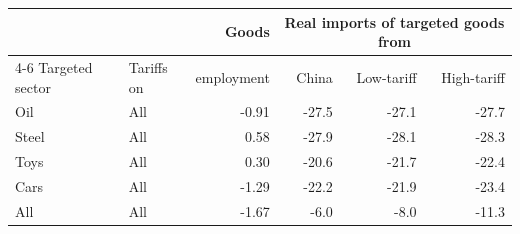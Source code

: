 \begin{tabular}{llrrrr}
\toprule
 & & Goods & \multicolumn{3}{c}{Real imports of targeted goods from} \\
\cmidrule(lr){4-6}
Targeted sector & Tariffs on & employment & China & Low-tariff & High-tariff \\
\midrule
Oil & All & -0.91 & -27.5 & -27.1 & -27.7 \\
\midrule
Steel & All & 0.58 & -27.9 & -28.1 & -28.3 \\
\midrule
Toys & All & 0.30 & -20.6 & -21.7 & -22.4 \\
\midrule
Cars & All & -1.29 & -22.2 & -21.9 & -23.4 \\
\midrule
All & All & -1.67 & -6.0 & -8.0 & -11.3 \\
\bottomrule
\end{tabular}

